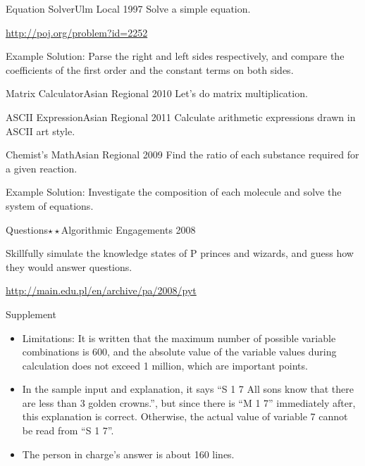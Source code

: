 \begin{pbox}{Equation Solver}{Ulm Local 1997}
Solve a simple equation.

\url{http://poj.org/problem?id=2252}
\end{pbox}

Example Solution: Parse the right and left sides respectively, and compare the coefficients of the first order and the constant terms on both sides.

\begin{pbox}{Matrix Calculator}{Asian Regional 2010}
Let's do matrix multiplication.

\end{pbox}

\begin{pbox}{ASCII Expression}{Asian Regional 2011}
Calculate arithmetic expressions drawn in ASCII art style.

\end{pbox}

\begin{pbox}{Chemist's Math}{Asian Regional 2009}
Find the ratio of each substance required for a given reaction.
  
\end{pbox}
Example Solution: Investigate the composition of each molecule and solve the system of equations.

\begin{pbox}{Questions$\star\star$}{Algorithmic Engagements 2008}

Skillfully simulate the knowledge states of P princes and wizards, and guess how they would answer questions.

\url{http://main.edu.pl/en/archive/pa/2008/pyt}
\end{pbox}

Supplement
\begin{itemize}
\setlength{\itemsep}{0pt}
\item Limitations: It is written that the maximum number of possible variable combinations is 600, and the absolute value of the variable values during calculation does not exceed 1 million, which are important points.
\item In the sample input and explanation, it says ``S 1 7 All sons know that there are less than 3 golden
  crowns.'', but since there is ``M 1 7'' immediately after, this explanation is correct. Otherwise, the actual value of variable 7 cannot be read from ``S 1 7''.
\item The person in charge's answer is about 160 lines.
\end{itemize}
